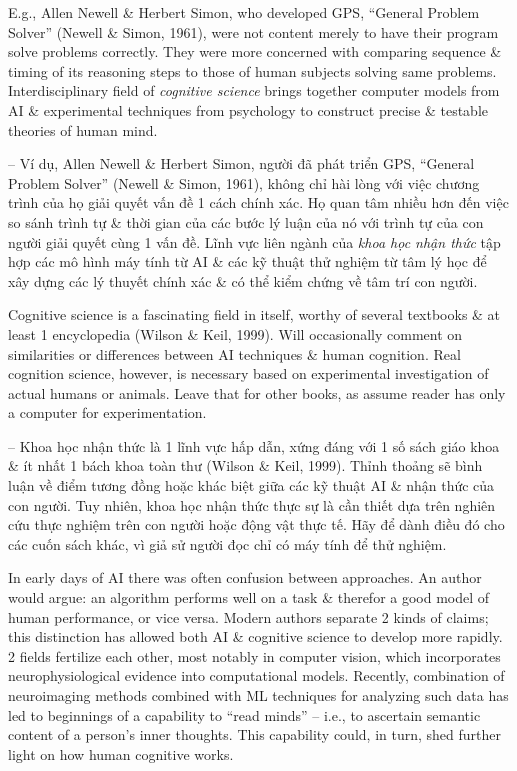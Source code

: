 \documentclass{article}
\begin{document}
\begin{itemize}
\begin{itemize}
\begin{itemize}
\begin{itemize}
				E.g., {\sc Allen Newell \& Herbert Simon}, who developed GPS, ``General Problem Solver'' (Newell \& Simon, 1961), were not content merely to have their program solve problems correctly. They were more concerned with comparing sequence \& timing of its reasoning steps to those of human subjects solving same problems. Interdisciplinary field of {\it cognitive science} brings together computer models from AI \& experimental techniques from psychology to construct precise \& testable theories of human mind.
				
				-- Ví dụ, {\sc Allen Newell \& Herbert Simon}, người đã phát triển GPS, ``General Problem Solver'' (Newell \& Simon, 1961), không chỉ hài lòng với việc chương trình của họ giải quyết vấn đề 1 cách chính xác. Họ quan tâm nhiều hơn đến việc so sánh trình tự \& thời gian của các bước lý luận của nó với trình tự của con người giải quyết cùng 1 vấn đề. Lĩnh vực liên ngành của {\it khoa học nhận thức} tập hợp các mô hình máy tính từ AI \& các kỹ thuật thử nghiệm từ tâm lý học để xây dựng các lý thuyết chính xác \& có thể kiểm chứng về tâm trí con người.
				
				Cognitive science is a fascinating field in itself, worthy of several textbooks \& at least 1 encyclopedia (Wilson \& Keil, 1999). Will occasionally comment on similarities or differences between AI techniques \& human cognition. Real cognition science, however, is necessary based on experimental investigation of actual humans or animals. Leave that for other books, as assume reader has only a computer for experimentation.
				
				-- Khoa học nhận thức là 1 lĩnh vực hấp dẫn, xứng đáng với 1 số sách giáo khoa \& ít nhất 1 bách khoa toàn thư (Wilson \& Keil, 1999). Thỉnh thoảng sẽ bình luận về điểm tương đồng hoặc khác biệt giữa các kỹ thuật AI \& nhận thức của con người. Tuy nhiên, khoa học nhận thức thực sự là cần thiết dựa trên nghiên cứu thực nghiệm trên con người hoặc động vật thực tế. Hãy để dành điều đó cho các cuốn sách khác, vì giả sử người đọc chỉ có máy tính để thử nghiệm.
				
				In early days of AI there was often confusion between approaches. An author would argue: an algorithm performs well on a task \& therefor a good model of human performance, or vice versa. Modern authors separate 2 kinds of claims; this distinction has allowed both AI \& cognitive science to develop more rapidly. 2 fields fertilize each other, most notably in computer vision, which incorporates neurophysiological evidence into computational models. Recently, combination of neuroimaging methods combined with ML techniques for analyzing such data has led to beginnings of a capability to ``read minds'' -- i.e., to ascertain semantic content of a person's inner thoughts. This capability could, in turn, shed further light on how human cognitive works.
				

\end{itemize}
\end{itemize}
\end{itemize}
\end{itemize}
\end{document}
